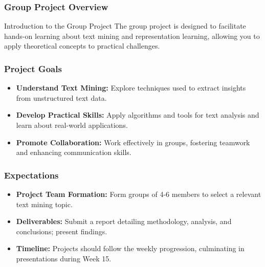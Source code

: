 \documentclass[aspectratio=169]{beamer}
\begin{document}
\begin{frame}[fragile]
    \frametitle{Group Project Overview}
    \begin{block}{Introduction to the Group Project}
        The group project is designed to facilitate hands-on learning about text mining and representation learning, allowing you to apply theoretical concepts to practical challenges.
    \end{block}
\end{frame}

\begin{frame}[fragile]
    \frametitle{Project Goals}
    \begin{itemize}
        \item \textbf{Understand Text Mining:} Explore techniques used to extract insights from unstructured text data.
        \item \textbf{Develop Practical Skills:} Apply algorithms and tools for text analysis and learn about real-world applications.
        \item \textbf{Promote Collaboration:} Work effectively in groups, fostering teamwork and enhancing communication skills.
    \end{itemize}
\end{frame}

\begin{frame}[fragile]
    \frametitle{Expectations}
    \begin{itemize}
        \item \textbf{Project Team Formation:} Form groups of 4-6 members to select a relevant text mining topic.
        \item \textbf{Deliverables:} Submit a report detailing methodology, analysis, and conclusions; present findings.
        \item \textbf{Timeline:} Projects should follow the weekly progression, culminating in presentations during Week 15.
    \end{itemize}
\end{frame}
\end{document}
